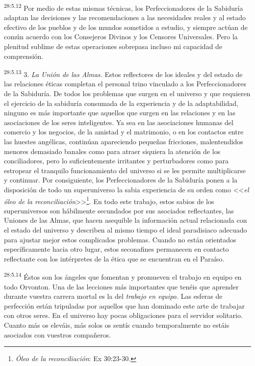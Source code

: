 \par
\textsuperscript{28:5.12} Por medio de estas mismas técnicas, los Perfeccionadores de la Sabiduría adaptan las decisiones y las recomendaciones a las necesidades reales y al estado efectivo de los pueblos y de los mundos sometidos a estudio, y siempre actúan de común acuerdo con los Consejeros Divinos y los Censores Universales. Pero la plenitud sublime de estas operaciones sobrepasa incluso mi capacidad de comprensión.

\par
\textsuperscript{28:5.13} 3. \textit{La Unión de las Almas.} Estos reflectores de los ideales y del estado de las relaciones éticas completan el personal trino vinculado a los Perfeccionadores de la Sabiduría. De todos los problemas que surgen en el universo y que requieren el ejercicio de la sabiduría consumada de la experiencia y de la adaptabilidad, ninguno es más importante que aquellos que surgen en las relaciones y en las asociaciones de los seres inteligentes. Ya sea en las asociaciones humanas del comercio y los negocios, de la amistad y el matrimonio, o en los contactos entre las huestes angélicas, continúan apareciendo pequeñas fricciones, malentendidos menores demasiado banales como para atraer siquiera la atención de los conciliadores, pero lo suficientemente irritantes y perturbadores como para estropear el tranquilo funcionamiento del universo si se les permite multiplicarse y continuar. Por consiguiente, los Perfeccionadores de la Sabiduría ponen a la disposición de todo un superuniverso la sabia experiencia de su orden como <<\textit{el óleo de la reconciliación}>>\footnote{\textit{Óleo de la reconciliación}: Ex 30:23-30.}. En todo este trabajo, estos sabios de los superuniversos son hábilmente secundados por sus asociados reflectantes, las Uniones de las Almas, que hacen asequible la información actual relacionada con el estado del universo y describen al mismo tiempo el ideal paradisiaco adecuado para ajustar mejor estos complicados problemas. Cuando no están orientados específicamente hacia otro lugar, estos seconafines permanecen en contacto reflectante con los intérpretes de la ética que se encuentran en el Paraíso.

\par
\textsuperscript{28:5.14} Éstos son los ángeles que fomentan y promueven el trabajo en equipo en todo Orvonton. Una de las lecciones más importantes que tenéis que aprender durante vuestra carrera mortal es la del \textit{trabajo en equipo.} Las esferas de perfección están tripuladas por aquellos que han dominado este arte de trabajar con otros seres. En el universo hay pocas obligaciones para el servidor solitario. Cuanto más os eleváis, más solos os sentís cuando temporalmente no estáis asociados con vuestros compañeros.

